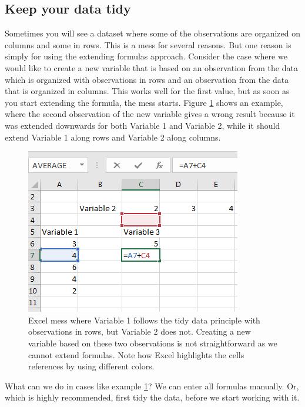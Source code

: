 \documentclass[]{book}
\begin{document}
\hypertarget{keep-your-data-tidy}{%
\subsection{Keep your data tidy}\label{keep-your-data-tidy}}

Sometimes you will see a dataset where some of the observations are organized on columns and some in rows. This is a mess for several reasons. But one reason is simply for using the extending formulas approach. Consider the case where we would like to create a new variable that is based on an observation from the data which is organized with observations in rows and an observation from the data that is organized in columns. This works well for the first value, but as soon as you start extending the formula, the mess starts. Figure \ref{fig:ex17} shows an example, where the second observation of the new variable gives a wrong result because it was extended downwards for both Variable 1 and Variable 2, while it should extend Variable 1 along rows and Variable 2 along columns.

\begin{figure}

{\centering \includegraphics[width=0.65\linewidth]{_resources/chapter_excelbasic/excelmess} 

}

\caption{Excel mess where Variable 1 follows the tidy data principle with observations in rows, but Variable 2 does not. Creating a new variable based on these two observations is not straightforward as we cannot extend formulas. Note how Excel highlights the cells references by using different colors.}\label{fig:ex17}
\end{figure}

What can we do in cases like example \ref{fig:ex17}? We can enter all formulas manually. Or, which is highly recommended, first tidy the data, before we start working with it.
\end{document}
